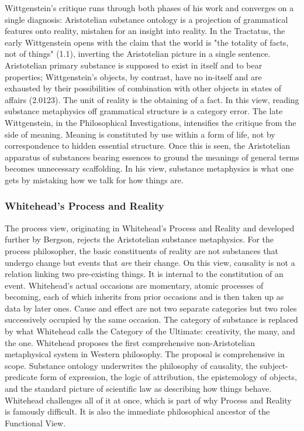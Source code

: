 Wittgenstein's critique runs through both phases of his work and converges on a single diagnosis: Aristotelian substance ontology is a projection of grammatical features onto reality, mistaken for an insight into reality. In the Tractatus\cite{wittgenstein1974tractatus}, the early Wittgenstein opens with the claim that the world is "the totality of facts, not of things" (1.1), inverting the Aristotelian picture in a single sentence. Aristotelian primary substance is supposed to exist in itself and to bear properties; Wittgenstein's objects, by contrast, have no in-itself and are exhausted by their possibilities of combination with other objects in states of affairs (2.0123). The unit of reality is the obtaining of a fact. In this view, reading substance metaphysics off grammatical structure is a category error.
The late Wittgenstein, in the Philosophical Investigations\cite{wittgenstein2009investigations}, intensifies the critique from the side of meaning. Meaning is constituted by use within a form of life, not by correspondence to hidden essential structure. Once this is seen, the Aristotelian apparatus of substances bearing essences to ground the meanings of general terms becomes unnecessary scaffolding. In his view, substance metaphysics is what one gets by mistaking how we talk for how things are.

\subsubsection{Whitehead's Process and Reality}

The process view, originating in Whitehead's Process and Reality\cite{whitehead2010process} and developed further by Bergson\cite{bergson2022creative}, rejects the Aristotelian substance metaphysics. For the process philosopher, the basic constituents of reality are not substances that undergo change but events that \emph{are} their change. On this view, causality is not a relation linking two pre-existing things. It is internal to the constitution of an event. Whitehead's actual occasions are momentary, atomic processes of becoming, each of which inherits from prior occasions and is then taken up as data by later ones. Cause and effect are not two separate categories but two roles successively occupied by the same occasion. The category of substance is replaced by what Whitehead calls the Category of the Ultimate: creativity, the many, and the one\cite{whitehead2010process}. Whitehead proposes the first comprehensive non-Aristotelian metaphysical system in Western philosophy. The proposal is comprehensive in scope. Substance ontology underwrites the philosophy of causality, the subject-predicate form of expression, the logic of attribution, the epistemology of objects, and the standard picture of scientific law as describing how things behave. Whitehead challenges all of it at once, which is part of why Process and Reality is famously difficult. It is also the immediate philosophical ancestor of the Functional View.
  

